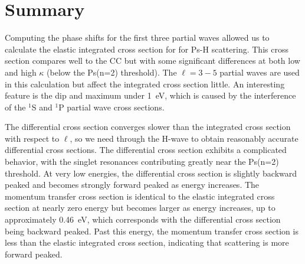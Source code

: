 \documentclass[Dissertation.tex]{subfiles}
\begin{document}
%
%



\section{Summary}
\label{sec:SummaryCross}

Computing the phase shifts for the first three partial waves allowed us to
calculate the elastic integrated cross section for for Ps-H scattering. This
cross section compares well to the CC \cite{Walters2004} but with some 
significant differences at both low and high $\kappa$ (below the Ps(n=2) 
threshold). The $\ell = 3 - 5$ partial waves are used in this calculation but
affect the integrated cross section little. An interesting feature is the
dip and maximum under \SI{1}{eV}, which is caused by the interference of the
$^1$S and $^1$P partial wave cross sections.

The differential cross section converges slower than the integrated cross
section with respect to $\ell$, so we need through the H-wave to obtain 
reasonably accurate differential cross sections. The differential cross section
exhibits a complicated behavior, with the singlet resonances contributing
greatly near the Ps(n=2) threshold. At very low energies, the differential
cross section is slightly backward peaked and becomes strongly forward peaked
as energy increases. The momentum transfer cross section is identical to the
elastic integrated cross section at nearly zero energy but becomes larger as
energy increases, up to approximately \SI{0.46}{eV}, which corresponds with the
differential cross section being backward peaked. Past this energy, the 
momentum transfer cross section is less than the elastic integrated cross
section, indicating that scattering is more forward peaked.



\biblio
\end{document}
